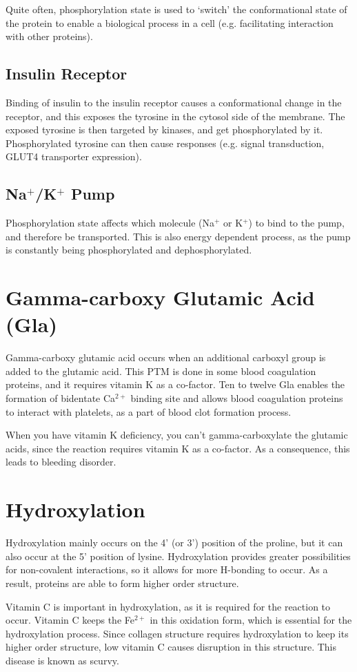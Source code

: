 Quite often, phosphorylation state is used to `switch' the conformational state of the protein to enable a biological process in a cell (e.g. facilitating interaction with other proteins).

\subsection{Insulin Receptor}

Binding of insulin to the insulin receptor causes a conformational change in the receptor, and this exposes the tyrosine in the cytosol side of the membrane.
The exposed tyrosine is then targeted by kinases, and get phosphorylated by it.
Phosphorylated tyrosine can then cause responses (e.g. signal transduction, GLUT4 transporter expression).

\subsection{Na$^+$/K$^+$ Pump}

Phosphorylation state affects which molecule (Na$^+$ or K$^+$) to bind to the pump, and therefore be transported.
This is also energy dependent process, as the pump is constantly being phosphorylated and dephosphorylated.

\section{Gamma-carboxy Glutamic Acid (Gla)}

Gamma-carboxy glutamic acid occurs when an additional carboxyl group is added to the glutamic acid.
This PTM is done in some blood coagulation proteins, and it requires vitamin K as a co-factor.
Ten to twelve Gla enables the formation of bidentate Ca$^{2+}$ binding site and allows blood coagulation proteins to interact with platelets, as a part of blood clot formation process.

When you have vitamin K deficiency, you can't gamma-carboxylate the glutamic acids, since the reaction requires vitamin K as a co-factor.
As a consequence, this leads to bleeding disorder.

\section{Hydroxylation}

Hydroxylation mainly occurs on the 4' (or 3') position of the proline, but it can also occur at the 5' position of lysine.
Hydroxylation provides greater possibilities for non-covalent interactions, so it allows for more H-bonding to occur.
As a result, proteins are able to form higher order structure.

Vitamin C is important in hydroxylation, as it is required for the reaction to occur.
Vitamin C keeps the Fe$^{2+}$ in this oxidation form, which is essential for the hydroxylation process.
Since collagen structure requires hydroxylation to keep its higher order structure, low vitamin C causes disruption in this structure.
This disease is known as scurvy.

